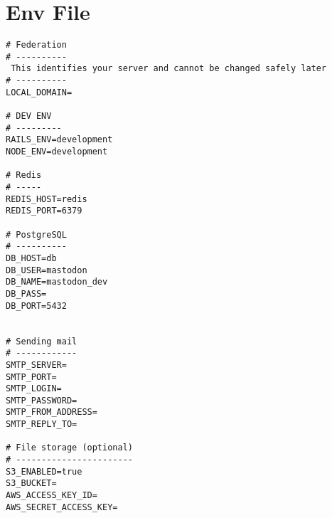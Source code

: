 \label{appendix:env_file}


\section{Env File}
\begin{verbatim}
# Federation
# ----------
 This identifies your server and cannot be changed safely later
# ----------
LOCAL_DOMAIN= 

# DEV ENV
# ---------
RAILS_ENV=development
NODE_ENV=development

# Redis
# -----
REDIS_HOST=redis
REDIS_PORT=6379

# PostgreSQL
# ----------
DB_HOST=db
DB_USER=mastodon
DB_NAME=mastodon_dev
DB_PASS=
DB_PORT=5432


# Sending mail
# ------------
SMTP_SERVER=
SMTP_PORT=
SMTP_LOGIN=
SMTP_PASSWORD=
SMTP_FROM_ADDRESS=
SMTP_REPLY_TO=

# File storage (optional)
# -----------------------
S3_ENABLED=true
S3_BUCKET=
AWS_ACCESS_KEY_ID=
AWS_SECRET_ACCESS_KEY=

\end{verbatim}
